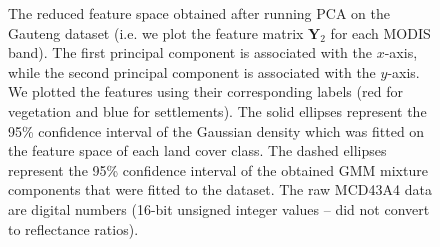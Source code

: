 \documentclass{article}
\begin{document}
\begin{figure}[h!]
%
\caption{The reduced feature space obtained after running PCA on the Gauteng dataset (i.e. we plot the feature matrix $\mathbf{Y}_2$ for each MODIS band). The first
principal component is associated with the $x$-axis, while the second principal component is associated with the $y$-axis. We plotted the features using their corresponding labels (red for vegetation 
and blue for settlements). The solid ellipses represent the 95\% confidence interval of the Gaussian density which was fitted on the feature space of each land cover class.
The dashed ellipses represent the 95\% confidence interval of the obtained GMM mixture components that were fitted to the dataset. 
The raw MCD43A4 data are digital numbers (16-bit unsigned integer values -- did not convert to reflectance ratios).}
\label{fig:density_PCA}
%
\end{figure}


\vfill
\pagebreak
\end{document}
